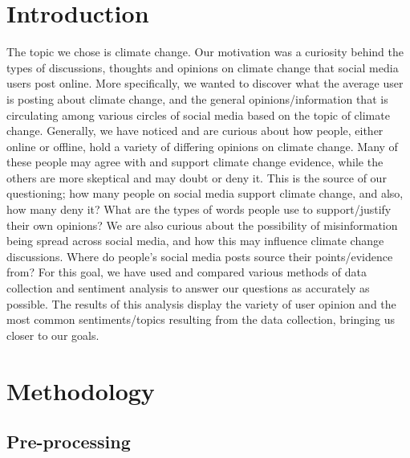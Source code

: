 \documentclass[12pt,titlepage]{article}
\begin{document}
\section{Introduction}
The topic we chose is climate change. Our motivation was a curiosity behind the types of discussions, thoughts and opinions on climate change that social media users post online. More specifically, we wanted to discover what the average user is posting about climate change, and the general opinions/information that is circulating among various circles of social media based on the topic of climate change. Generally, we have noticed and are curious about how people, either online or offline, hold a variety of differing opinions on climate change. Many of these people may agree with and support climate change evidence, while the others are more skeptical and may doubt or deny it. This is the source of our questioning; how many people on social media support climate change, and also, how many deny it? What are the types of words people use to support/justify their own opinions? We are also curious about the possibility of misinformation being spread across social media, and how this may influence climate change discussions. Where do people’s social media posts source their points/evidence from? For this goal, we have used and compared various methods of data collection and sentiment analysis to answer our questions as accurately as possible. The results of this analysis display the variety of user opinion and the most common sentiments/topics resulting from the data collection, bringing us closer to our goals.

\newpage
\section{Methodology}

\subsection{Pre-processing}


\newpage
\end{document}
